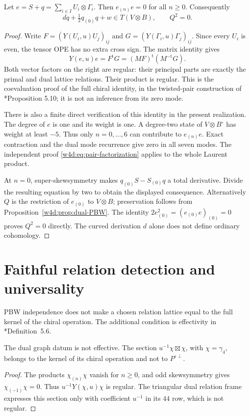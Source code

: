 \begin{proposition}\label{w4d:prop:coupling}
Let $e=S+q=\sum_{i\in I}U_i\otimes\Gamma_i$. Then $e_{(n)}e=0$ for all $n\geq0$. Consequently
\[
 dq+\tfrac12q_{(0)}q+w\in T(V\otimes B),\qquad Q^2=0.
\]
\end{proposition}
\begin{proof}
Write $F=(Y(U_i,u)U_j)_{ij}$ and $G=(Y(\Gamma_i,u)\Gamma_j)_{ij}$. Since every $U_i$ is even, the tensor OPE has no extra cross sign. The matrix identity gives
\begin{equation}\label{w4d:eq:pair-factorization}
 Y(e,u)e=F^{\mathrm t}G=(MF)^{\mathrm t}(M^{-\mathrm t}G).
\end{equation}
Both vector factors on the right are regular: their principal parts are exactly the primal and dual lattice relations. Their product is regular. This is the coevaluation proof of the full chiral identity, in the twisted-pair construction of \cite{kdx:GLZ}*{Proposition 5.10}; it is not an inference from its zero mode.

There is also a finite direct verification of this identity in the present realization. The degree of $e$ is one and its weight is one. A degree-two state of $V\otimes B^\circ$ has weight at least $-5$. Thus only $n=0,\ldots,6$ can contribute to $e_{(n)}e$. Exact contraction and the dual mode recurrence give zero in all seven modes. The independent proof \eqref{w4d:eq:pair-factorization} applies to the whole Laurent product.

At $n=0$, super-skewsymmetry makes $q_{(0)}S-S_{(0)}q$ a total derivative. Divide the resulting equation by two to obtain the displayed consequence. Alternatively $Q$ is the restriction of $e_{(0)}$ to $V\otimes B$; preservation follows from Proposition~\ref{w4d:prop:dual-PBW}. The identity $2e_{(0)}^2=(e_{(0)}e)_{(0)}=0$ proves $Q^2=0$ directly. The curved derivation $d$ alone does not define ordinary cohomology.
\end{proof}

\section{Faithful relation detection and universality}\label{w4d:sec:universal}
PBW independence does not make a chosen relation lattice equal to the
full kernel of the chiral operation. The additional condition is
effectivity in \cite{kdx:GLZ}*{Definition~5.6}.

\begin{proposition}\label{w4d:prop:ineffective}
The dual graph datum is not effective. The section
$u^{-1}\chi\boxtimes\chi$, with $\chi=\gamma_4$, belongs to the kernel
of its chiral operation and not to $P^{\circ\perp}$.
\end{proposition}
\begin{proof}
The products $\chi_{(n)}\chi$ vanish for $n\geq0$, and odd
skewsymmetry gives $\chi_{(-1)}\chi=0$. Thus
$u^{-1}Y(\chi,u)\chi$ is regular. The triangular dual relation frame
expresses this section only with coefficient $u^{-1}$ in its $44$
row, which is not regular.
\end{proof}

